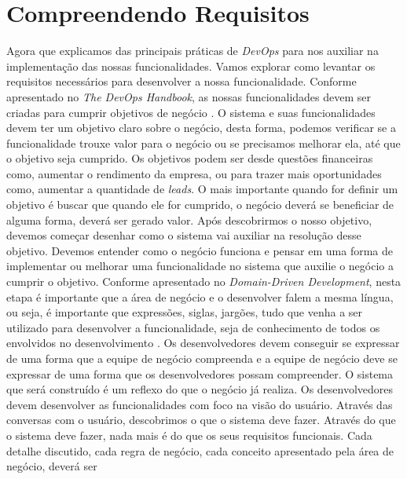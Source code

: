   \section{Compreendendo Requisitos}
    Agora que explicamos das principais práticas de \textit{DevOps} para nos
    auxiliar na implementação das nossas funcionalidades. Vamos explorar como
    levantar os requisitos necessários para desenvolver a nossa funcionalidade. \newline
    Conforme apresentado no \textit{The DevOps Handbook}, as nossas funcionalidades
    devem ser criadas para cumprir objetivos de negócio \cite{TheDevOpsHandbook}.
    O sistema e suas funcionalidades devem ter um objetivo claro sobre o negócio,
    desta forma, podemos verificar se a funcionalidade trouxe valor para o negócio
    ou se precisamos melhorar ela, até que o objetivo seja cumprido. Os objetivos
    podem ser desde questões financeiras como, aumentar o rendimento da empresa,
    ou para trazer mais oportunidades como, aumentar a quantidade de \textit{leads}.
    O mais importante quando for definir um objetivo é buscar que quando ele for
    cumprido, o negócio deverá se beneficiar de alguma forma, deverá ser gerado
    valor. \newline
    Após descobrirmos o nosso objetivo, devemos começar desenhar como o sistema
    vai auxiliar na resolução desse objetivo. Devemos entender como o negócio
    funciona e pensar em uma forma de implementar ou melhorar uma funcionalidade
    no sistema que auxilie o negócio a cumprir o objetivo. Conforme apresentado
    no \textit{Domain-Driven Development}, nesta etapa é importante que a área de
    negócio e o desenvolver falem a mesma língua, ou seja, é importante que expressões,
    siglas, jargões, tudo que venha a ser utilizado para desenvolver a funcionalidade,
    seja de conhecimento de todos os envolvidos no desenvolvimento \cite{DomainDrivenDesign}.
    Os desenvolvedores devem conseguir se expressar de uma forma que a equipe de
    negócio compreenda e a equipe de negócio deve se expressar de uma forma que
    os desenvolvedores possam compreender. O sistema que será construído é um
    reflexo do que o negócio já realiza. Os desenvolvedores devem desenvolver as
    funcionalidades com foco na visão do usuário. Através das conversas com o usuário,
    descobrimos o que o sistema deve fazer. Através do que o sistema deve fazer,
    nada mais é do que os seus requisitos funcionais. Cada detalhe discutido, cada
    regra de negócio, cada conceito apresentado pela área de negócio, deverá ser
